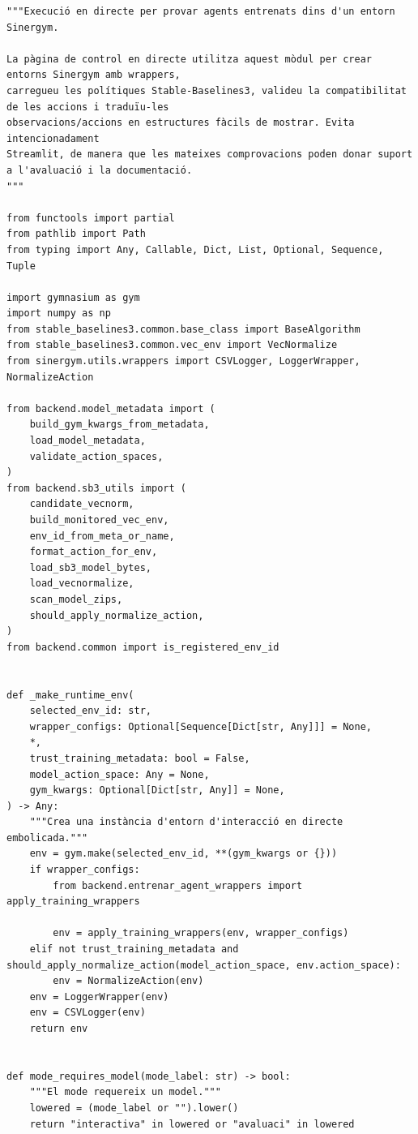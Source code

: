 \documentclass[10pt,a4paper]{article}
\begin{document}
\begin{lstlisting}[style=studioPython,caption={backend/interaccionar\_agent\_backend.py},label={lst:backend-interaccionar-agent-backend-py}]
"""Execució en directe per provar agents entrenats dins d'un entorn Sinergym.

La pàgina de control en directe utilitza aquest mòdul per crear entorns Sinergym amb wrappers,
carregueu les polítiques Stable-Baselines3, valideu la compatibilitat de les accions i traduïu-les
observacions/accions en estructures fàcils de mostrar. Evita intencionadament
Streamlit, de manera que les mateixes comprovacions poden donar suport a l'avaluació i la documentació.
"""

from functools import partial
from pathlib import Path
from typing import Any, Callable, Dict, List, Optional, Sequence, Tuple

import gymnasium as gym
import numpy as np
from stable_baselines3.common.base_class import BaseAlgorithm
from stable_baselines3.common.vec_env import VecNormalize
from sinergym.utils.wrappers import CSVLogger, LoggerWrapper, NormalizeAction

from backend.model_metadata import (
    build_gym_kwargs_from_metadata,
    load_model_metadata,
    validate_action_spaces,
)
from backend.sb3_utils import (
    candidate_vecnorm,
    build_monitored_vec_env,
    env_id_from_meta_or_name,
    format_action_for_env,
    load_sb3_model_bytes,
    load_vecnormalize,
    scan_model_zips,
    should_apply_normalize_action,
)
from backend.common import is_registered_env_id


def _make_runtime_env(
    selected_env_id: str,
    wrapper_configs: Optional[Sequence[Dict[str, Any]]] = None,
    *,
    trust_training_metadata: bool = False,
    model_action_space: Any = None,
    gym_kwargs: Optional[Dict[str, Any]] = None,
) -> Any:
    """Crea una instància d'entorn d'interacció en directe embolicada."""
    env = gym.make(selected_env_id, **(gym_kwargs or {}))
    if wrapper_configs:
        from backend.entrenar_agent_wrappers import apply_training_wrappers

        env = apply_training_wrappers(env, wrapper_configs)
    elif not trust_training_metadata and should_apply_normalize_action(model_action_space, env.action_space):
        env = NormalizeAction(env)
    env = LoggerWrapper(env)
    env = CSVLogger(env)
    return env


def mode_requires_model(mode_label: str) -> bool:
    """El mode requereix un model."""
    lowered = (mode_label or "").lower()
    return "interactiva" in lowered or "avaluaci" in lowered



\end{lstlisting}
\end{document}
